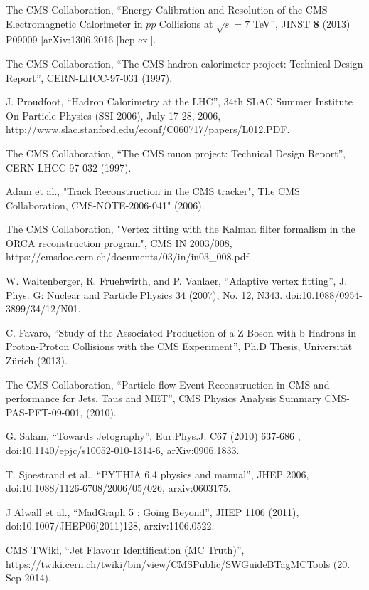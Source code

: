 \begin{thebibliography}{99}
The CMS Collaboration, ``Energy Calibration and Resolution of the CMS Electromagnetic Calorimeter in $pp$ Collisions at $\sqrt{s} = 7$ TeV'', JINST {\bf 8} (2013) P09009 [arXiv:1306.2016 [hep-ex]].

The CMS Collaboration, “The CMS hadron calorimeter project: Technical Design Report”, CERN-LHCC-97-031 (1997).

J. Proudfoot, ``Hadron Calorimetry at the LHC'', 34th SLAC Summer Institute On Particle Physics (SSI 2006), July 17-28, 2006, http://www.slac.stanford.edu/econf/C060717/papers/L012.PDF.

The CMS Collaboration, “The CMS muon project: Technical Design Report”, CERN-LHCC-97-032 (1997).

Adam et al., "Track Reconstruction in the CMS tracker", The CMS Collaboration, CMS-NOTE-2006-041" (2006).

 The CMS Collaboration, "Vertex fitting with the Kalman filter formalism in the ORCA reconstruction program", CMS IN 2003/008, https://cmsdoc.cern.ch/documents/03/in/in03\_008.pdf.

 W. Waltenberger, R. Fruehwirth, and P. Vanlaer, “Adaptive vertex fitting”, J. Phys. G: Nuclear and Particle Physics 34 (2007), No. 12, N343. doi:10.1088/0954-3899/34/12/N01.

C. Favaro, ``Study of the Associated Production of a Z Boson with b Hadrons in Proton-Proton Collisions with the CMS Experiment'', Ph.D Thesis, Universität Zürich (2013).

 The CMS Collaboration, ``Particle-flow Event Reconstruction in CMS and performance for Jets, Taus and MET'', CMS Physics Analysis Summary CMS-PAS-PFT-09-001, (2010).

G. Salam, ``Towards Jetography'', Eur.Phys.J. C67 (2010) 637-686 , doi:10.1140/epjc/s10052-010-1314-6, arXiv:0906.1833.

T. Sjoestrand et al., ``PYTHIA 6.4 physics and manual'', JHEP 2006, doi:10.1088/1126-6708/2006/05/026, arxiv:0603175.

 J Alwall et al., ``MadGraph 5 : Going Beyond'', JHEP 1106 (2011), doi:10.1007/JHEP06(2011)128, arxiv:1106.0522.

CMS TWiki, ``Jet Flavour Identification (MC Truth)'', https://twiki.cern.ch/twiki/bin/view/CMSPublic/SWGuideBTagMCTools (20. Sep 2014).
 

\end{thebibliography}
